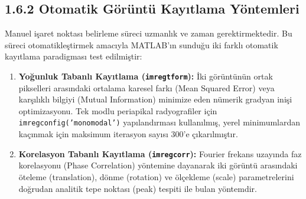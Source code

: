 \documentclass[12pt,a4paper]{article}
\begin{document}
\newpage
\subsection{1.6.2 Otomatik Görüntü Kayıtlama Yöntemleri}
Manuel işaret noktası belirleme süreci uzmanlık ve zaman gerektirmektedir. Bu süreci otomatikleştirmek amacıyla MATLAB'ın sunduğu iki farklı otomatik kayıtlama paradigması test edilmiştir:
\begin{enumerate}
    \item \textbf{Yoğunluk Tabanlı Kayıtlama (\texttt{imregtform}):} İki görüntünün ortak pikselleri arasındaki ortalama karesel farkı (Mean Squared Error) veya karşılıklı bilgiyi (Mutual Information) minimize eden nümerik gradyan inişi optimizasyonu. Tek modlu periapikal radyografiler için \texttt{imregconfig('monomodal')} yapılandırması kullanılmış, yerel minimumlardan kaçınmak için maksimum iterasyon sayısı 300'e çıkarılmıştır.
    \item \textbf{Korelasyon Tabanlı Kayıtlama (\texttt{imregcorr}):} Fourier frekans uzayında faz korelasyonu (Phase Correlation) yöntemine dayanarak iki görüntü arasındaki öteleme (translation), dönme (rotation) ve ölçekleme (scale) parametrelerini doğrudan analitik tepe noktası (peak) tespiti ile bulan yöntemdir.
\end{enumerate}
\end{document}
